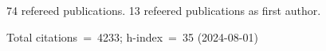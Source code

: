 74 refereed publications. 13 refeered publications as first author.

Total citations~=~4233; h-index~=~35 (2024-08-01)